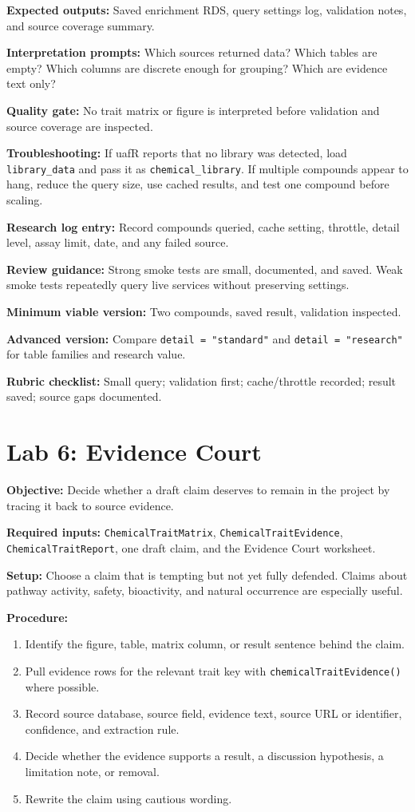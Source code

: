\textbf{Expected outputs:} Saved enrichment RDS, query settings log, validation notes, and source coverage summary.

\textbf{Interpretation prompts:} Which sources returned data? Which tables are empty? Which columns are discrete enough for grouping? Which are evidence text only?

\textbf{Quality gate:} No trait matrix or figure is interpreted before validation and source coverage are inspected.

\textbf{Troubleshooting:} If uafR reports that no library was detected, load \texttt{library\_data} and pass it as \texttt{chemical\_library}. If multiple compounds appear to hang, reduce the query size, use cached results, and test one compound before scaling.

\textbf{Research log entry:} Record compounds queried, cache setting, throttle, detail level, assay limit, date, and any failed source.

\textbf{Review guidance:} Strong smoke tests are small, documented, and saved. Weak smoke tests repeatedly query live services without preserving settings.

\textbf{Minimum viable version:} Two compounds, saved result, validation inspected.

\textbf{Advanced version:} Compare \texttt{detail = "standard"} and \texttt{detail = "research"} for table families and research value.

\textbf{Rubric checklist:} Small query; validation first; cache/throttle recorded; result saved; source gaps documented.

\section{Lab 6: Evidence Court}
\textbf{Objective:} Decide whether a draft claim deserves to remain in the project by tracing it back to source evidence.

\textbf{Required inputs:} \texttt{ChemicalTraitMatrix}, \texttt{ChemicalTraitEvidence}, \texttt{ChemicalTraitReport}, one draft claim, and the Evidence Court worksheet.

\textbf{Setup:} Choose a claim that is tempting but not yet fully defended. Claims about pathway activity, safety, bioactivity, and natural occurrence are especially useful.

\textbf{Procedure:}
\begin{enumerate}
  \item Identify the figure, table, matrix column, or result sentence behind the claim.
  \item Pull evidence rows for the relevant trait key with \texttt{chemicalTraitEvidence()} where possible.
  \item Record source database, source field, evidence text, source URL or identifier, confidence, and extraction rule.
  \item Decide whether the evidence supports a result, a discussion hypothesis, a limitation note, or removal.
  \item Rewrite the claim using cautious wording.
\end{enumerate}

